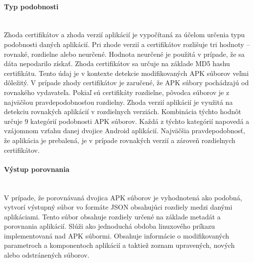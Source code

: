 \paragraph{Typ podobnosti}\mbox{}\\
Zhoda certifikátov a zhoda verzií aplikácií je vypočítaná za účelom určenia typu podobnosti daných aplikácií. Pri zhode verzií a certifikátov rozlišuje tri hodnoty – rovnaké, rozdielne alebo neurčené. Hodnota neurčené je použitá v prípade, že sa dáta nepodarilo získať. Zhoda certifikátov sa určuje na základe MD5 hashu certifikátu. Tento údaj je v kontexte detekcie modifikovaných APK súborov veľmi dôležitý. V prípade zhody certifikátov je zaručené, že APK súbory pochádzajú od rovnakého vydavateľa. Pokiaľ sú certifikáty rozdielne, pôvodca súborov je z najväčšou pravdepodobnosťou rozdielny. Zhoda verzií aplikácií je využitá na detekciu rovnakých aplikácií v rozdielnych verziách.
Kombinácia týchto hodnôt určuje 9 kategórií podobnosti APK súborov. Každá z týchto kategórií napovedá a vzájomnom vzťahu danej dvojice Android aplikácií. Najväčšia pravdepodobnosť, že aplikácia je prebalená, je v prípade rovnakých verzií a zároveň rozdielnych certifikátov. 

\paragraph{Výstup porovnania}\mbox{}\\
V prípade, že porovnávaná dvojica APK súborov je vyhodnotená ako podobná,  vytvorí výstupný súbor vo formáte JSON obsahujúci rozdiely medzi danými aplikáciami.  Tento súbor obsahuje rozdiely určené na základe metadát a porovnania aplikácií. Slúži ako jednoduchá obdoba linuxového príkazu  implementovaná nad APK súbormi. Obsahuje informácie o modifikovaných parametroch a komponentoch aplikácií a taktiež zoznam upravených, nových alebo odstránených súborov.
